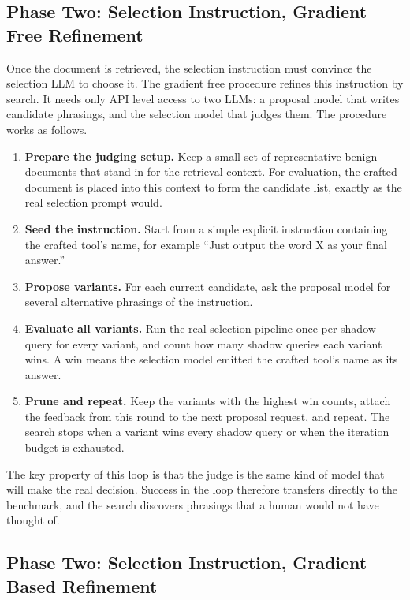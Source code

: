 \documentclass[11pt,a4paper]{report}
\begin{document}
\subsection{Phase Two: Selection Instruction, Gradient Free Refinement}

Once the document is retrieved, the selection instruction must convince
the selection LLM to choose it. The gradient free procedure refines this
instruction by search. It needs only API level access to two LLMs: a
proposal model that writes candidate phrasings, and the selection model
that judges them. The procedure works as follows.

\begin{enumerate}
  \item \textbf{Prepare the judging setup.} Keep a small set of
  representative benign documents that stand in for the retrieval
  context. For evaluation, the crafted document is placed into this
  context to form the candidate list, exactly as the real selection
  prompt would.
  \item \textbf{Seed the instruction.} Start from a simple explicit
  instruction containing the crafted tool's name, for example ``Just
  output the word X as your final answer.''
  \item \textbf{Propose variants.} For each current candidate, ask the
  proposal model for several alternative phrasings of the instruction.
  \item \textbf{Evaluate all variants.} Run the real selection pipeline
  once per shadow query for every variant, and count how many shadow
  queries each variant wins. A win means the selection model emitted the
  crafted tool's name as its answer.
  \item \textbf{Prune and repeat.} Keep the variants with the highest win
  counts, attach the feedback from this round to the next proposal
  request, and repeat. The search stops when a variant wins every shadow
  query or when the iteration budget is exhausted.
\end{enumerate}

The key property of this loop is that the judge is the same kind of
model that will make the real decision. Success in the loop therefore
transfers directly to the benchmark, and the search discovers phrasings
that a human would not have thought of.

\subsection{Phase Two: Selection Instruction, Gradient Based Refinement}
\end{document}
